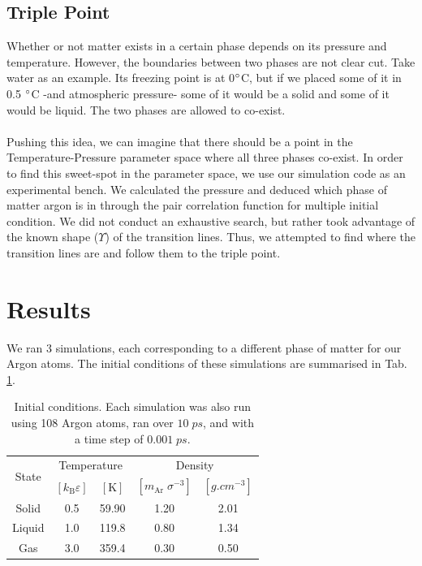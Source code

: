 \documentclass{IAYCPro}
\newcommand{\ssi}[1]{\;\si{#1}} %
\begin{document}
\subsection{Triple Point}
Whether or not matter exists in a certain phase depends on its pressure and temperature. However, the boundaries between two phases are not clear cut. Take water as an example. Its freezing point is at 0$\degree$C, but if we placed some of it in 0.5 $\degree$C -and atmospheric pressure- some of it would be a solid and some of it would be liquid. The two phases are allowed to co-exist. \\ \\
Pushing this idea, we can imagine that there should be a point in the Temperature-Pressure parameter space where all three phases co-exist. In order to find this sweet-spot in the parameter space, we use our simulation code as an experimental bench. We calculated the pressure and deduced which phase of matter argon is in through the pair correlation function for multiple initial condition. We did not conduct an exhaustive search, but rather took advantage of the known shape ($\Upsilon$) of the transition lines. Thus, we attempted to find where the transition lines are and follow them to the triple point.
\section{Results}
\label{sct: Results}
We ran 3 simulations, each corresponding to a different phase of matter for our Argon atoms. The initial conditions of these simulations are summarised in Tab. \ref{tab: Initial Conditions}. 

{\renewcommand{\arraystretch}{1.2}
\begin{table}[H]
    \centering
    \begin{tabular}{c||c|c|c|c}
    \multirow{2}{*}{State} & \multicolumn{2}{c|}{Temperature} & \multicolumn{2}{c}{Density} \\
    \cline{2-5}
         & $[k_\mathrm{B}\varepsilon]$ & $[\mathrm{K}]$ & $\left[m_\mathrm{Ar}\;\sigma^{-3} \right]$ & $\left[\si{g.cm^{-3}}\right]$ \\
    \hline
       Solid  & 0.5 & 59.90 & 1.20 & 2.01\\
       Liquid & 1.0 & 119.8 & 0.80 & 1.34\\
       Gas    & 3.0 & 359.4 & 0.30 & 0.50\\
    \end{tabular}
    \caption{Initial conditions. Each simulation was also run using 108 Argon atoms, ran over $10\ssi{ps}$, and with a time step of $0.001\ssi{ps}$.}
    \label{tab: Initial Conditions}
\end{table}
}
\end{document}
